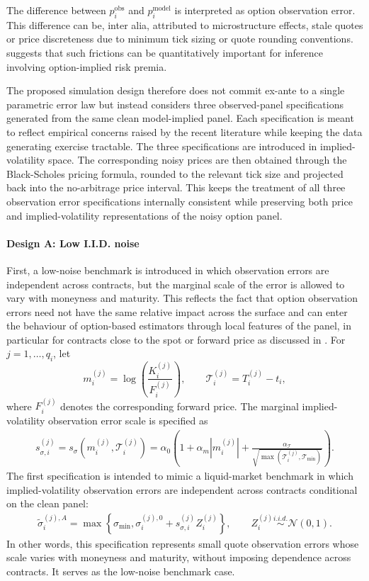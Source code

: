 \documentclass[11pt,a4paper,notitlepage]{article}
\numberwithin{equation}{section}
\begin{document}
The difference between $p_i^{\mathrm{obs}}$ and $p_i^{\mathrm{model}}$ is interpreted as option observation error.
This difference can be, inter alia, attributed to microstructure effects, stale quotes or price discreteness due to minimum tick sizing or quote rounding conventions. \citet{duarte2024very}
suggests that such frictions can be quantitatively important for inference involving option-implied risk premia. 

The proposed simulation design therefore does not commit ex-ante to a single parametric error law but instead considers three observed-panel specifications generated from the same clean model-implied panel. Each specification is meant to reflect empirical concerns raised by the recent literature while keeping the data generating exercise tractable. The three specifications are introduced in implied-volatility space. The corresponding noisy prices are then obtained through the Black-Scholes pricing formula, rounded to the relevant tick size and projected back into the no-arbitrage price interval. This keeps the treatment of all three observation error specifications internally consistent while preserving both price and implied-volatility representations of the noisy option panel.

\paragraph{Design A: Low I.I.D. noise}
First, a low-noise benchmark is introduced in which observation errors are independent across contracts, but the marginal scale of the error is allowed to vary with moneyness and maturity. This reflects the fact that option observation errors need not have the same relative impact across the surface and can enter the behaviour of option-based estimators through local features of the panel, in particular for contracts close to the spot or forward price as discussed in \cite{chongtodorov2024vov}.
For $j=1,\ldots,q_i$, let
\[
m_i^{(j)}=\log\left(\frac{K_i^{(j)}}{F_i^{(j)}}\right),
\qquad
\mathcal T_i^{(j)}=T_i^{(j)}-t_i,
\]
where $F_i^{(j)}$ denotes the corresponding forward price. The marginal implied-volatility observation error scale is specified as
\begin{align}
s_{\sigma,i}^{(j)}
=
s_\sigma(m_i^{(j)},\mathcal T_i^{(j)})
=
\alpha_0\left(
1+\alpha_m |m_i^{(j)}|
+\frac{\alpha_{\mathcal T}}{\sqrt{\max(\mathcal T_i^{(j)},\mathcal T_{\min})}}
\right).
\label{eq:iv_error_scale}
\end{align}
The first specification is intended to mimic a liquid-market benchmark in which implied-volatility observation errors are independent across contracts conditional on the clean panel:
\begin{align}
\tilde\sigma_i^{(j),A}
=
\max\left\{
\sigma_{\min},
\sigma_i^{(j),0}
+
s_{\sigma,i}^{(j)}Z_i^{(j)}
\right\},
\qquad
Z_i^{(j)}\overset{i.i.d.}{\sim}\mathcal{N}(0,1).
\label{eq:noise_liquid}
\end{align}
In other words, this specification represents small quote observation errors whose scale varies with moneyness and maturity, without imposing dependence across contracts. It serves as the low-noise benchmark case.
\end{document}
